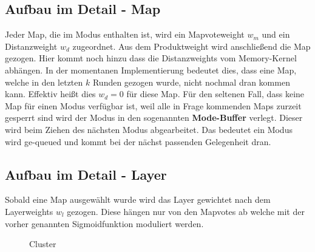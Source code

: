     \subsection{Aufbau im Detail - Map}
    Jeder Map, die im Modus enthalten ist, wird ein Mapvoteweight $w_m$ und ein Distanzweight $w_d$ zugeordnet. 
    Aus dem Produktweight wird anschließend die Map gezogen. 
    Hier kommt noch hinzu dass die Distanzweights vom Memory-Kernel abhängen. 
    In der momentanen Implementierung bedeutet dies, dass eine Map, welche in den letzten $k$ Runden gezogen wurde, nicht nochmal dran kommen kann. 
    Effektiv heißt dies $w_d=0$ für diese Map. 
    Für den seltenen Fall, dass keine Map für einen Modus verfügbar ist, weil alle in Frage kommenden Maps zurzeit gesperrt sind wird der Modus in den sogenannten \textbf{Mode-Buffer} verlegt. 
    Dieser wird beim Ziehen des nächsten Modus abgearbeitet. 
    Das bedeutet ein Modus wird \glqq{}ge-queued\grqq{} und kommt bei der nächst passenden Gelegenheit dran. 
    
    \subsection{Aufbau im Detail - Layer}
    Sobald eine Map ausgewählt wurde wird das Layer gewichtet nach dem Layerweights $w_l$ gezogen. 
    Diese hängen nur von den Mapvotes ab welche mit der vorher genannten Sigmoidfunktion moduliert werden. 
    \begin{figure}[htbp]
    \caption{Cluster}
    \end{figure}
